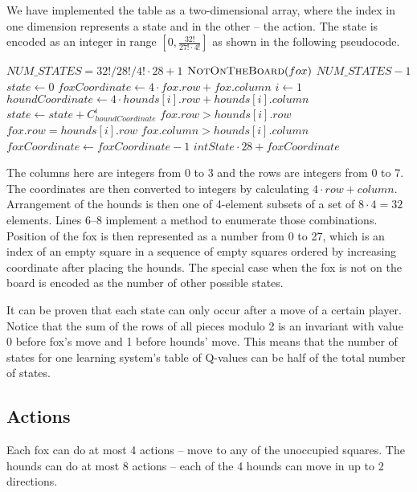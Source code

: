 \documentclass[a4paper]{article}
\begin{document}
We have implemented the table as a two-dimensional array, where the index in
one dimension represents a state and in the other -- the action. The state is
encoded as an integer in range $[0, \frac{32!}{27! \cdot 4!}]$ as shown in the
following pseudocode.

\begin{codebox}
    \li $NUM\_STATES = 32! / 28! / 4! \cdot 28 + 1$
    \li \If $\textnormal{\scshape NotOnTheBoard}(fox)$
    \li     \Then \Return $NUM\_STATES - 1$
        \End
    \li $state \gets 0$
    \li $foxCoordinate \gets 4 \cdot fox.row + fox.column$
    \li \For $i \gets 1$ 
    \li \Do $houndCoordinate \gets 4 \cdot hounds[i].row + hounds[i].column$
    \li     $state \gets state + C_{houndCoordinate}^i$
    \li     \If $fox.row > hounds[i].row$ 
    \li \>\> $fox.row = hounds[i].row$  $fox.column > hounds[i].column$
    \li         \Then $foxCoordinate \gets foxCoordinate - 1$
            \End
        \End
    \li \Return $intState \cdot 28 + foxCoordinate$
    \End
\end{codebox}

The columns here are integers from 0 to 3 and the rows are integers from 0 to 7.
The coordinates are then converted to integers by calculating $4 \cdot row +
column$. Arrangement of the hounds is then one of 4-element subsets of a set of
$8 \cdot 4 = 32$ elements. Lines 6--8 implement a method to enumerate those
combinations. Position of the fox is then represented as a number from 0 to 27,
which is an index of an empty square in a sequence of empty squares ordered by
increasing coordinate after placing the hounds. The special case when the fox
is not on the board is encoded as the number of other possible states.

It can be proven that each state can only occur after a move of a certain
player. Notice that the sum of the rows of all pieces modulo 2 is an invariant
with value 0 before fox's move and 1 before hounds' move. This means that the
number of states for one learning system's table of Q-values can be half of the
total number of states.

\subsection{Actions}
Each fox can do at most 4 actions -- move to any of the unoccupied squares. The
hounds can do at most 8 actions -- each of the 4 hounds can move in up to 2
directions.
\end{document}
